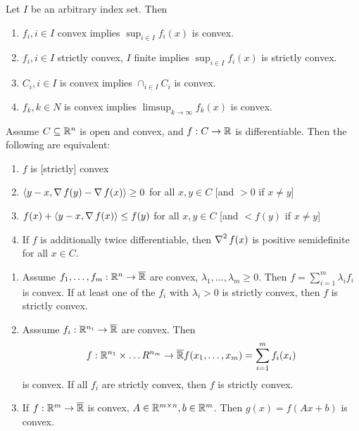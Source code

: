 \begin{thm}
  \label{sec:convexity-8}
  Let $I$ be an arbitrary index set. Then
  \begin{enumerate}
  \item $f_{i}, i \in I$ convex implies $\sup_{i \in I} f_{i}(x)$ is
    convex.
  \item $f_{i}, i \in I$ strictly convex, $I$ finite implies $\sup_{i
      \in I} f_{i}(x)$ is strictly convex.
  \item $C_{i}, i \in I$ is convex implies $\cap_{i \in I} C_{i}$ is convex.
  \item $f_{k}, k \in N$ is convex implies $\limsup_{k \rightarrow
      \infty} f_{k}(x)$ is convex.
  \end{enumerate}
\end{thm}

\begin{thm}
  \label{sec:convexity-9}
  Assume $C \subseteq \mathbb{R}^{n}$ is open and convex, and $f: C
  \rightarrow \mathbb{R}$ is differentiable. Then the following are
  equivalent:
  \begin{enumerate}
  \item $f$ is [strictly] convex
  \item $\IP{y-x, \grad f(y) - \grad f(x)} \geq 0$ for all $x, y \in
    C$ [and $> 0$ if $x \neq y$]
  \item $f(x) + \IP{y- x, \grad f(x)} \leq f(y)$ for all $x, y \in C$
    [and $< f(y)$ if $x \neq y$]
  \item If $f$ is additionally twice differentiable, then $\operatorname*{\nabla}^{2}
    f(x)$ is positive semidefinite for all $x \in C$.
  \end{enumerate}
\end{thm}

\begin{thm}
  \label{sec:convexity-10}
  \begin{enumerate}
  \item Assume $f_{1}, \dots, f_{m}: \mathbb{R}^{n} \rightarrow \overline {\mathbb{R}}$
    are convex, $\lambda_{1}, \dots, \lambda_{m} \geq 0$.  Then $f =
    \sum_{i=1}^{m} \lambda_{i} f_{i}$ is convex.  If at least one of
    the $f_{i}$ with $\lambda_{i} > 0$ is strictly convex, then $f$ is
    strictly convex.
  \item Asssume $f_{i}: \mathbb{R}^{n_{i}} \rightarrow \overline {\mathbb{R}}$ are
    convex.  Then
    \begin{align}
      \label{eq:7}
      f: \mathbb{R}^{n_{1}} \times \dots R^{n_{m}} \rightarrow \overline {\mathbb{R}}
      f(x_{1}, \dots, x_{m}) = \sum_{i=1}^{m} f_{i}(x_{i})
    \end{align} is convex. If all $f_{i}$ are strictly convex, then
    $f$ is strictly convex.
  \item If $f: \mathbb{R}^{m} \rightarrow \overline {\mathbb{R}}$ is convex, $A \in
    \mathbb{R}^{m \times n}, b \in \mathbb{R}^{m}$.  Then $g(x) = f(Ax + b)$ is convex.
  \end{enumerate}
\end{thm}

